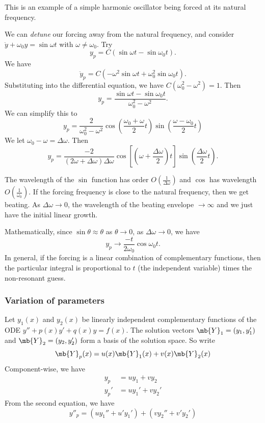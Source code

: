 \documentclass[a4paper]{article}
\begin{document}
\note This is an example of a simple harmonic oscillator being forced at its natural frequency.

We can \emph{detune} our forcing away from the natural frequency, and consider $\ddot y + \omega_0 y = \sin \omega t$ with $\omega \not= \omega_0$. Try
\[
y_p = C(\sin \omega t - \sin \omega_0 t).
\]
We have
\[
\ddot y_p = C(-\omega^2 \sin \omega t + \omega_0^2 \sin\omega_0 t).
\]
Substituting into the differential equation, we have $C(\omega_0^2 - \omega^2) = 1$. Then 
\[
y_p = \frac{\sin \omega t - \sin \omega_0t}{\omega_0^2 - \omega^2}.
\]
We can simplify this to 
\[
y_p = \frac{2}{\omega_0^2 - \omega^2} \cos \left(\frac{\omega_0 + \omega}{2}t\right) \sin \left(\frac{\omega - \omega_0}{2} t\right)
\]
We let $\omega_0 - \omega = \Delta \omega$. Then
\[
y_p = \frac{-2}{(2\omega + \Delta \omega)\Delta \omega}\cos \left[\left(\omega + \frac{\Delta \omega}{2}\right)t\right] \sin \left(\frac{\Delta \omega}{2}t\right).
\]

\newpage %
The wavelength of the $\sin$ function has order $O(\frac{1}{\Delta \omega})$ and $\cos$ has wavelength $O(\frac{1}{\omega_0})$. If the forcing frequency is close to the natural frequency, then we get beating. As $\Delta\omega\to 0$, the wavelength of the beating envelope $\to \infty$ and we just have the initial linear growth.

Mathematically, since $\sin\theta \approx \theta$ as $\theta \to 0$, as $\Delta\omega \to 0$, we have
\[
y_p\to \frac{-t}{2\omega_0}\cos\omega_0 t.
\]
In general, if the forcing is a linear combination of complementary functions, then the particular integral is proportional to $t$ (the independent variable) times the non-resonant guess.

\subsubsection{Variation of parameters}
Let $y_1(x)$ and $y_2(x)$ be linearly independent complementary functions of the ODE $y'' + p(x)y' + q(x)y = f(x)$. The solution vectors $\mb{Y}_1 = (y_1, y_1')$ and $\mb{Y}_2 = (y_2, y_2')$ form a basis of the solution space. So write
\[
\mb{Y}_p(x) = u(x)\mb{Y}_1(x) + v(x)\mb{Y}_2(x)
\]
Component-wise, we have 
\begin{align*}
  y_p &= uy_1 + vy_2 \tag{a}\\
  y_p' &= uy_1' + vy_2' \tag{b}
\end{align*}
From the second equation, we have
\[
y''_p  = (uy_1'' + u'y_1') + (vy_2'' + v'y_2') \tag{c}
\]
\end{document}
